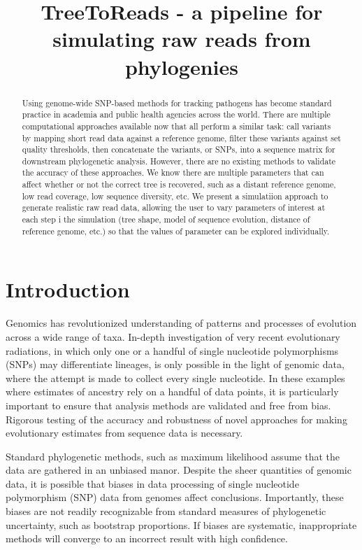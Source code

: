 \documentclass[a4paper,10pt]{article}
\title{TreeToReads - a pipeline for simulating raw reads from phylogenies}
\author{}
\begin{document}
\maketitle

\begin{abstract}
Using genome-wide SNP-based methods for tracking pathogens has become standard practice in academia and public health agencies across the world. 
There are multiple computational approaches available now that all perform a similar task: call variants by mapping short read data against a reference genome, filter these variants against set quality thresholds, then concatenate the variants, or SNPs, into a sequence matrix for downstream phylogenetic analysis. However, there are no existing methods to validate the accuracy of these approaches. 
We know there are multiple parameters that can affect whether or not the correct tree is recovered, such as a distant reference genome, low read coverage, low sequence diversity, etc. 
We present a simulatiion approach to generate realistic raw read data, allowing the user to vary  parameters of interest at each step i the simulation (tree shape, model of sequence evolution, distance of reference genome, etc.) so that the values of parameter can be explored individually.

\end{abstract}

\section{Introduction}
Genomics has revolutionized understanding of patterns and processes of evolution across a wide range of taxa.
In-depth investigation of very recent evolutionary radiations, in which only one or a handful of single nucleotide polymorphisms (SNPs) may differentiate lineages, 
is only possible in the light of genomic data, where the attempt is made to collect every single nucleotide.
In these examples where estimates of ancestry rely on a handful of data points, it is particularly important to ensure that analysis methods are validated and free from bias. 
Rigorous testing of the accuracy and robustness of novel approaches for making evolutionary estimates
from sequence data is necessary.

Standard phylogenetic methods, such as maximum likelihood assume that the data are gathered in an unbiased manor.
Despite the sheer quantities of genomic data, it is possible that biases in data processing of single nucleotide polymorphism (SNP) data from genomes
affect conclusions.
Importantly, these biases are not readily recognizable from standard measures of phylogenetic uncertainty, 
such as bootstrap proportions.
If biases are systematic, inappropriate methods will converge to an incorrect result with high confidence.
\end{document}
